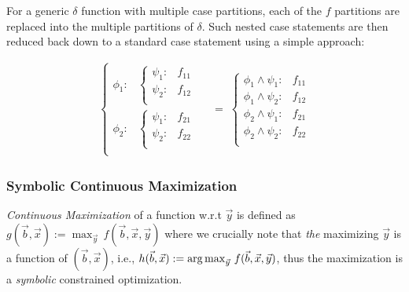 \documentclass[twoside,11pt]{article}
\def\argmax{\operatornamewithlimits{arg\max}}
\begin{document}
For a generic $\delta$ function with multiple case partitions, each of the $f$ partitions are replaced into the multiple partitions of $\delta$. Such nested case statements are then reduced back down to a standard case
statement using a simple approach:

\begin{align*}
    \begin{cases}
      \phi_1: & 
        \begin{cases}
          \psi_1: & f_{11} \\ 
          \psi_2: & f_{12}  \\ 
        \end{cases} \\
      \phi_2: & 
        \begin{cases}
          \psi_1: & f_{21} \\ 
          \psi_2: & f_{22}  \\ 
        \end{cases} \\
    \end{cases} & \; = \;
        \begin{cases}
          \phi_1 \land \psi_1: & f_{11} \\ 
          \phi_1 \land \psi_2: & f_{12}  \\ 
          \phi_2 \land \psi_1: & f_{21} \\ 
          \phi_2 \land \psi_2: & f_{22}  \\ 
        \end{cases} 
\end{align*}

 
\subsubsection{Symbolic Continuous Maximization}
\label{contmax}
\emph{Continuous Maximization} of a function w.r.t $\vec{y}$ is defined as $g(\vec{b},\vec{x}) := \max_{\vec{y}}
\, f(\vec{b},\vec{x},\vec{y})$ where we crucially note that 
\emph{the} maximizing $\vec{y}$ is a function of $(\vec{b},\vec{x})$, i.e., $h(\vec{b},\vec{x}) := \argmax_{\vec{y}} \, f(\vec{b},\vec{x},\vec{y})$, thus the maximization is a \emph{symbolic} 
constrained optimization.
\end{document}
